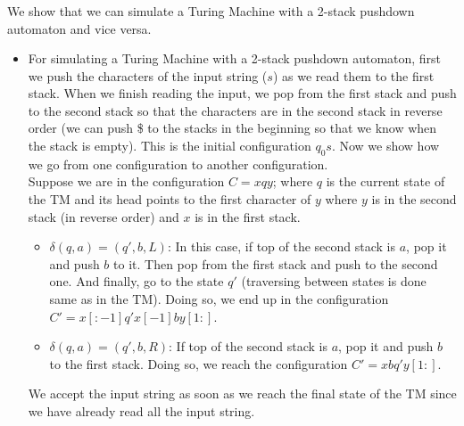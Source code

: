 \documentclass{article}
\begin{document}
\subsubsection{}
We show that we can simulate a Turing Machine with a 2-stack pushdown automaton and vice versa.\\
\begin{itemize}
\item For simulating a Turing Machine with a 2-stack pushdown automaton, first we push the characters of the input string (\(s\)) as we read them to the first stack.
When we finish reading the input, we pop from the first stack and push to the second stack so that the characters are in the second stack in reverse order (we can push \$ to the stacks in the beginning so that we know when the stack is empty).
This is the initial configuration \(q_0s\).
Now we show how we go from one configuration to another configuration.\\
Suppose we are in the configuration \(C=xqy\); where \(q\) is the current state of the TM and its head points to the first character of \(y\) where \(y\) is in the second stack (in reverse order) and \(x\) is in the first stack.
\begin{itemize}[label=\(\circ\)]
\item \(\delta(q, a) = (q', b, L)\):
In this case, if top of the second stack is \(a\), pop it and push \(b\) to it. Then pop from the first stack and push to the second one.
And finally, go to the state \(q'\) (traversing between states is done same as in the TM).
Doing so, we end up in the configuration \(C'=x{[:-1]}q'x{[-1]}by{[1:]}\).
\item \(\delta(q, a) = (q', b, R)\):
If top of the second stack is \(a\), pop it and push \(b\) to the first stack.
Doing so, we reach the configuration \(C'=xbq'y[1:]\).
\end{itemize}
We accept the input string as soon as we reach the final state of the TM since we have already read all the input string.


\end{itemize}
\end{document}
